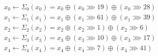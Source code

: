 \begin{equation}
\label{eq:ascon_linear}
\begin{aligned}
& x_0 \leftarrow \Sigma_0\left(x_0\right)=x_0 \oplus\left(x_0 \ggg 19\right) \oplus\left(x_0 \ggg 28\right) \\
& x_1 \leftarrow \Sigma_1\left(x_1\right)=x_1 \oplus\left(x_1 \ggg 61\right) \oplus\left(x_1 \ggg 39\right) \\
& x_2 \leftarrow \Sigma_2\left(x_2\right)=x_2 \oplus\left(x_2 \ggg 1\right) \oplus\left(x_2 \ggg 6\right) \\
& x_3 \leftarrow \Sigma_3\left(x_3\right)=x_3 \oplus\left(x_3 \ggg 10\right) \oplus\left(x_3 \ggg 17\right) \\
& x_4 \leftarrow \Sigma_4\left(x_4\right)=x_4 \oplus\left(x_4 \ggg 7\right) \oplus\left(x_4 \ggg 41\right)
\end{aligned}
\end{equation}

